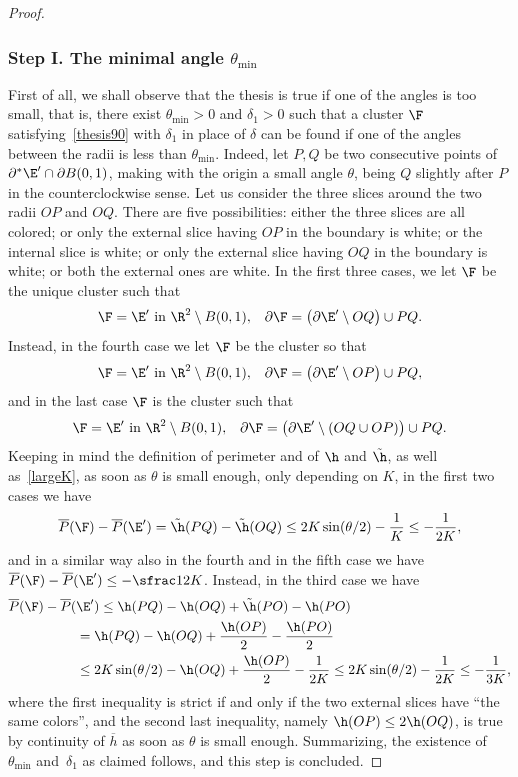 \begin{proof}
\subsubsection*{Step I. The minimal angle $\theta_{\min}$}
First of all, we shall observe that the thesis is true if one of the angles is too small, that is, there exist $\theta_{\min}>0$ and $\delta_1>0$ such that a cluster $\F$ satisfying~\eqref{thesis90} with $\delta_1$ in place of $\delta$ can be found if one of the angles between the radii is less than $\theta_{\min}$. Indeed, let $P,Q$ be two consecutive points of $\partial^*\E'\cap\partial B(0,1)$, making with the origin a small angle $\theta$, being $Q$ slightly after $P$ in the counterclockwise sense. Let us consider the three slices around the two radii $OP$ and $OQ$. There are five possibilities: either the three slices are all colored; or only the external slice having $OP$ in the boundary is white; or the internal slice is white; or only the external slice having $OQ$ in the boundary is white; or both the external ones are white. In the first three cases, we let $\F$ be the unique cluster such that
\begin{align*}
\F=\E' \ \hbox{in } \R^2\setminus B(0,1), &&
\partial\F=\big(\partial\E' \setminus OQ\big) \cup PQ.
\end{align*}
Instead, in the fourth case we let $\F$ be the cluster so that
\begin{align*}
\F=\E' \ \hbox{in } \R^2\setminus B(0,1), &&
\partial\F=\big(\partial\E' \setminus OP\big) \cup PQ,
\end{align*}
and in the last case $\F$ is the cluster such that
\begin{align*}
\F=\E' \ \hbox{in } \R^2\setminus B(0,1), &&
\partial\F=\big(\partial\E' \setminus (OQ\cup OP)\big) \cup PQ.
\end{align*}
Keeping in mind the definition of perimeter and of $\h$ and $\tilde\h$, as well as~\eqref{largeK}, as soon as $\theta$ is small enough, only depending on $K$, in the first two cases we have
\[
\overline P(\F) - \overline P(\E') = \tilde\h(PQ) - \tilde\h(OQ) \leq 2K\sin(\theta/2) -\frac 1K\leq - \frac 1{2K},
\]
and in a similar way also in the fourth and in the fifth case we have $\overline P(\F) - \overline P(\E') \leq - \sfrac 1{2K}$. Instead, in the third case we have
\[\begin{split}
\overline P(\F)-\overline P(&\E') \leq \h(PQ)-\h(OQ)+\tilde \h (PO)-\h(PO)\\
&=\h(PQ) -\h(OQ) + \frac{\h(OP)}2-\frac{\h(PO)}2 \\
&\leq 2K\sin(\theta/2) -\h(OQ) + \frac{\h(OP)}2-\frac 1{2K}
\leq 2K\sin(\theta/2) -\frac 1{2K}
\leq -\frac 1{3K},
\end{split}\]
where the first inequality is strict if and only if the two external slices have ``the same colors'', and the second last inequality, namely $\h(OP)\leq 2\h(OQ)$, is true by continuity of $\overline h$ as soon as $\theta$ is small enough. Summarizing, the existence of~$\theta_{\min}$ and~$\delta_1$ as claimed follows, and this step is concluded.


\end{proof}
